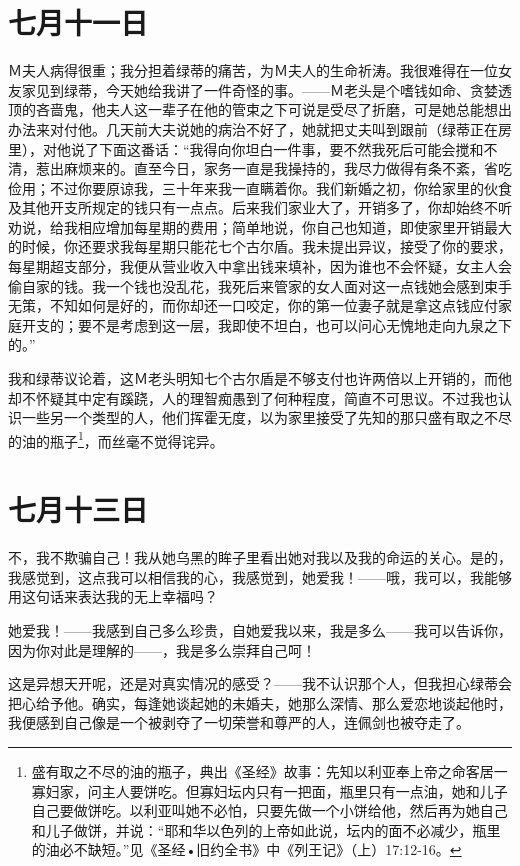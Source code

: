 \documentclass[12pt,oneside]{book}
\begin{document}
\chapter{七月十一日}
\label{sec-2-19}
Ｍ夫人病得很重；我分担着绿蒂的痛苦，为Ｍ夫人的生命祈涛。我很难得在一位女友家见到绿蒂，今天她给我讲了一件奇怪的事。——Ｍ老头是个嗜钱如命、贪婪透顶的吝啬鬼，他夫人这一辈子在他的管束之下可说是受尽了折磨，可是她总能想出办法来对付他。几天前大夫说她的病治不好了，她就把丈夫叫到跟前（绿蒂正在房里），对他说了下面这番话：“我得向你坦白一件事，要不然我死后可能会搅和不清，惹出麻烦来的。直至今日，家务一直是我操持的，我尽力做得有条不紊，省吃俭用；不过你要原谅我，三十年来我一直瞒着你。我们新婚之初，你给家里的伙食及其他开支所规定的钱只有一点点。后来我们家业大了，开销多了，你却始终不听劝说，给我相应增加每星期的费用；简单地说，你自己也知道，即使家里开销最大的时候，你还要求我每星期只能花七个古尔盾。我未提出异议，接受了你的要求，每星期超支部分，我便从营业收入中拿出钱来填补，因为谁也不会怀疑，女主人会偷自家的钱。我一个钱也没乱花，我死后来管家的女人面对这一点钱她会感到束手无策，不知如何是好的，而你却还一口咬定，你的第一位妻子就是拿这点钱应付家庭开支的；要不是考虑到这一层，我即使不坦白，也可以问心无愧地走向九泉之下的。”

我和绿蒂议论着，这Ｍ老头明知七个古尔盾是不够支付也许两倍以上开销的，而他却不怀疑其中定有蹊跷，人的理智痴愚到了何种程度，简直不可思议。不过我也认识一些另一个类型的人，他们挥霍无度，以为家里接受了先知的那只盛有取之不尽的油的瓶子\footnote{盛有取之不尽的油的瓶子，典出《圣经》故事：先知以利亚奉上帝之命客居一寡妇家，问主人要饼吃。但寡妇坛内只有一把面，瓶里只有一点油，她和儿子自己要做饼吃。以利亚叫她不必怕，只要先做一个小饼给他，然后再为她自己和儿子做饼，并说：“耶和华以色列的上帝如此说，坛内的面不必减少，瓶里的油必不缺短。”见《圣经•旧约全书》中《列王记》（上）17:12-16。}，而丝毫不觉得诧异。


\chapter{七月十三日}
\label{sec-2-20}
不，我不欺骗自己！我从她乌黑的眸子里看出她对我以及我的命运的关心。是的，我感觉到，这点我可以相信我的心，我感觉到，她爱我！——哦，我可以，我能够用这句话来表达我的无上幸福吗？

她爱我！——我感到自己多么珍贵，自她爱我以来，我是多么——我可以告诉你，因为你对此是理解的——，我是多么崇拜自己呵！

这是异想天开呢，还是对真实情况的感受？——我不认识那个人，但我担心绿蒂会把心给予他。确实，每逢她谈起她的未婚夫，她那么深情、那么爱恋地谈起他时，我便感到自己像是一个被剥夺了一切荣誉和尊严的人，连佩剑也被夺走了。
\end{document}
